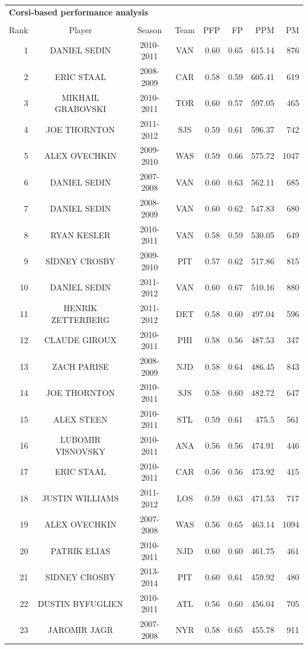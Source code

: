 \begin{table}[p]
	\centering\small
	\begin{tabular}{r c c c| r r r r  }
		\multicolumn{8}{l}{\bf Corsi-based performance analysis}\\ \\
		Rank & Player & Season & Team & PFP & FP & PPM & PM   \\ 
		\hline\rule{0pt}{4ex} 
		1&DANIEL SEDIN&2010-2011&VAN&0.60&0.65&615.14&876\\
		2&ERIC STAAL&2008-2009&CAR&0.58&0.59&605.41&619\\
		3&MIKHAIL GRABOVSKI&2010-2011&TOR&0.60&0.57&597.05&465\\
		4&JOE THORNTON&2011-2012&SJS&0.59&0.61&596.37&742\\
		5&ALEX OVECHKIN&2009-2010&WAS&0.59&0.66&575.72&1047\\
		6&DANIEL SEDIN&2007-2008&VAN&0.60&0.63&562.11&685\\
		7&DANIEL SEDIN&2008-2009&VAN&0.60&0.62&547.83&680\\
		8&RYAN KESLER&2010-2011&VAN&0.58&0.59&530.05&649\\
		9&SIDNEY CROSBY&2009-2010&PIT&0.57&0.62&517.86&815\\
		10&DANIEL SEDIN&2011-2012&VAN&0.60&0.67&510.16&880\\
		11&HENRIK ZETTERBERG&2011-2012&DET&0.58&0.60&497.04&596\\
		12&CLAUDE GIROUX&2010-2011&PHI&0.58&0.56&487.53&347\\
		13&ZACH PARISE&2008-2009&NJD&0.58&0.64&486.45&843\\
		14&JOE THORNTON&2010-2011&SJS&0.58&0.60&482.72&647\\
		15&ALEX STEEN&2010-2011&STL&0.59&0.61&475.5&561\\
		16&LUBOMIR VISNOVSKY&2010-2011&ANA&0.56&0.56&474.91&446\\
		17&ERIC STAAL&2010-2011&CAR&0.56&0.56&473.92&415\\
		18&JUSTIN WILLIAMS&2011-2012&LOS&0.59&0.63&471.53&717\\
		19&ALEX OVECHKIN&2007-2008&WAS&0.56&0.65&463.14&1094\\
		20&PATRIK ELIAS&2010-2011&NJD&0.60&0.60&461.75&461\\
		21&SIDNEY CROSBY&2013-2014&PIT&0.60&0.61&459.92&480\\
		22&DUSTIN BYFUGLIEN&2010-2011&ATL&0.56&0.60&456.04&705\\
		23&JAROMIR JAGR&2007-2008&NYR&0.58&0.65&455.78&911\\

\end{tabular}
\end{table}

